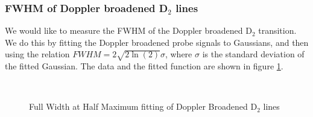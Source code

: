 \documentclass[12pt]{article}
\begin{document}
\subsubsection*{FWHM of Doppler broadened D$_2$ lines}

We would like to measure the FWHM of the Doppler broadened D$_2$ transition.  We do this by fitting the Doppler broadened probe signals to Gaussians, and then using the relation $FWHM = 2 \sqrt{2 \ln(2)}\sigma$, where $\sigma$ is the standard deviation of the fitted Gaussian.  The data and the fitted function are shown in figure \ref{fig:FWHM}.

\begin{figure}%
	\centering
	\,
	\caption{Full Width at Half Maximum fitting of Doppler Broadened D$_2$ lines}%
	\label{fig:FWHM}%
\end{figure}
\end{document}
